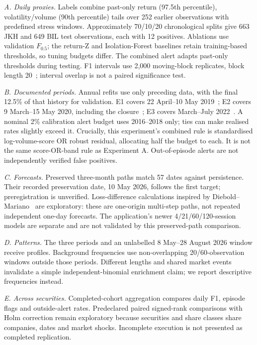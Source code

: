 \documentclass[conference]{IEEEtran}
\begin{document}
\emph{A. Daily proxies.} Labels combine past-only return (97.5th percentile), volatility/volume (90th percentile) tails over 252 earlier observations with predefined stress windows. Approximately 70/10/20 chronological splits give 663 JKH and 649 BIL test observations, each with 12 positives. Ablations use validation $F_{0.5}$; the return-Z and Isolation-Forest baselines retain training-based thresholds, so tuning budgets differ. The combined alert adapts past-only thresholds during testing. F1 intervals use 2,000 moving-block replicates, block length 20~\cite{kunsch1989}; interval overlap is not a paired significance test.

\emph{B. Documented periods.} Annual refits use only preceding data, with the final 12.5\% of that history for validation. E1 covers 22 April--10 May 2019~\cite{ft_easter2019}; E2 covers 9 March--15 May 2020, including the closure~\cite{morning_covid2020}; E3 covers March--July 2022~\cite{bs_halt2022}. A nominal 2\% calibration alert budget uses 2016--2018 only; ties can make realised rates slightly exceed it. Crucially, this experiment's combined rule is standardised log-volume-score OR robust residual, allocating half the budget to each. It is not the same score-OR-band rule as Experiment A. Out-of-episode alerts are not independently verified false positives.

\emph{C. Forecasts.} Preserved three-month paths match 57 dates against persistence. Their recorded preservation date, 10 May 2026, follows the first target; preregistration is unverified. Loss-difference calculations inspired by Diebold--Mariano~\cite{diebold1995} are exploratory: these are one-origin multi-step paths, not repeated independent one-day forecasts. The application's newer 4/21/60/120-session models are separate and are not validated by this preserved-path comparison.

\emph{D. Patterns.} The three periods and an unlabelled 8 May--28 August 2026 window receive profiles. Background frequencies use non-overlapping 20/60-observation windows outside those periods. Different lengths and shared market events invalidate a simple independent-binomial enrichment claim; we report descriptive frequencies instead.

\emph{E. Across securities.} Completed-cohort aggregation compares daily F1, episode flags and outside-alert rates. Predeclared paired signed-rank comparisons with Holm correction remain exploratory because securities and share classes share companies, dates and market shocks. Incomplete execution is not presented as completed replication.
\end{document}
